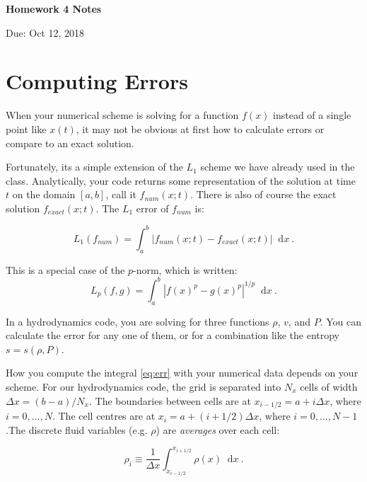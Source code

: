 \documentclass{article}
\newcommand*\diff{\mathop{}\!\mathrm{d}}
\begin{document}
\begin{center}

\vspace*{-2.5cm}
\LARGE
\bf{Homework 4 Notes}
\vspace{1cm}

\large{Due: Oct 12, 2018}
\vspace{1cm}

\end{center}

\section{Computing Errors}

When your numerical scheme is solving for a function $f(x)$ instead of a single point like $x(t)$, it may not be obvious at first how to calculate errors or compare to an exact solution.

Fortunately, its a simple extension of the $L_1$ scheme we have already used in the class.  Analytically, your code returns some representation of the solution at time $t$ on the domain $[a,b]$, call it $f_{num}(x;t)$.  There is also of course the exact solution $f_{exact}(x;t)$.  The $L_1$ error of $f_{num}$ is:

\begin{equation}
	L_1(f_{num}) = \int_a^b \left | f_{num}(x;t) - f_{exact}(x;t) \right | \diff x \ . \label{eq:err}
\end{equation}

This is a special case of the $p$-norm, which is written:
\begin{equation}
	L_p(f,g) = \int_a^b \left | f(x)^p - g(x)^p \right |^{1/p} \diff x \ .
\end{equation}

In a hydrodynamics code, you are solving for three functions $\rho$, $v$, and $P$. You can calculate the error for any one of them, or for a combination like the entropy $s = s(\rho, P)$.  

How you compute the integral \eqref{eq:err} with your numerical data depends on your scheme.  For our hydrodynamics code, the grid is separated into $N_x$ cells of width $\Delta x = (b-a) / N_x$. The boundaries between cells are at $x_{i-1/2} = a+ i \Delta x$, where $i=0,\dots,N$.  The cell centres are at $x_i = a+ (i+1/2) \Delta x$, where $i=0, \dots, N-1$.The discrete fluid variables (e.g. $\rho$) are \emph{averages} over each cell:

\begin{equation}
	\rho_i \equiv \frac{1}{\Delta x}\int_{x_{i-1/2}}^{x_{i+1/2}} \rho(x) \diff x  \ .
\end{equation}
\end{document}
